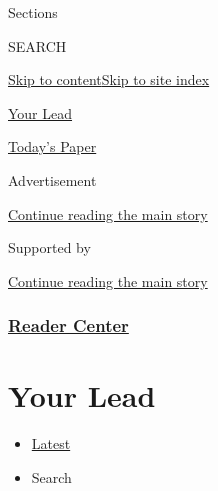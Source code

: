 Sections

SEARCH

\protect\hyperlink{site-content}{Skip to
content}\protect\hyperlink{site-index}{Skip to site index}

\href{https://www.nytimes3xbfgragh.onion/series/your-lead}{Your Lead}

\href{https://myaccount.nytimes3xbfgragh.onion/auth/login?response_type=cookie\&client_id=vi}{}

\href{https://www.nytimes3xbfgragh.onion/section/todayspaper}{Today's
Paper}

Advertisement

\protect\hyperlink{after-top}{Continue reading the main story}

Supported by

\protect\hyperlink{after-sponsor}{Continue reading the main story}

\hypertarget{reader-center}{%
\subsubsection{\texorpdfstring{\href{/section/reader-center}{Reader
Center}}{Reader Center}}\label{reader-center}}

\hypertarget{your-lead}{%
\section{Your Lead}\label{your-lead}}

\begin{itemize}
\tightlist
\item
  \protect\hyperlink{stream-panel}{Latest}
\item
  Search
\end{itemize}

